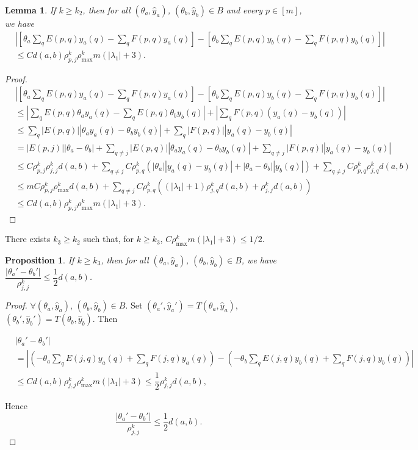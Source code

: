 \documentclass[11pt,a4paper]{article}
\theoremstyle{plain}              %
\newtheorem{lemma}[theorem]{Lemma}
\newtheorem{proposition}[theorem]{Proposition}
\theoremstyle{definition}         %
\begin{document}
\begin{lemma}
If \(k\geq k_2\), then for all \((\theta_a,\hat{y}_a)\), \((\theta_b,\hat{y}_b)\in B\) and every \(p\in[m]\), we have
\begin{align*}
&\left|\left[\theta_a\sum_{q}E(p,q)y_a(q)-\sum_{q}F(p,q)y_a(q)\right]-\left[\theta_b\sum_{q}E(p,q)y_b(q)-\sum_{q}F(p,q)y_b(q)\right]\right|\\
&\leq Cd(a,b)\rho_{p,j}^k\rho_{\max}^km(|\lambda_1|+3).
\end{align*}
\end{lemma}
\begin{proof}
\begin{align*}
&\left|\left[\theta_a\sum_{q}E(p,q)y_a(q)-\sum_{q}F(p,q)y_a(q)\right]-\left[\theta_b\sum_{q}E(p,q)y_b(q)-\sum_{q}F(p,q)y_b(q)\right]\right|\\
&\leq\left|\sum_{q}E(p,q)\theta_ay_a(q)-\sum_{q}E(p,q)\theta_by_b(q)\right|+\left|\sum_{q}F(p,q)(y_a(q)-y_b(q))\right|\\
&\leq\sum_{q}|E(p,q)||\theta_ay_a(q)-\theta_by_b(q)|+\sum_{q}|F(p,q)||y_a(q)-y_b(q)|\\
&=|E(p,j)||\theta_a-\theta_b|+\sum_{q\neq j}|E(p,q)||\theta_ay_a(q)-\theta_by_b(q)|+\sum_{q\neq j}|F(p,q)||y_a(q)-y_b(q)|\\
&\leq C\rho_{p,j}^k\rho_{j,j}^kd(a,b)+\sum_{q\neq j}C\rho_{p,q}^k(|\theta_a||y_a(q)-y_b(q)|+|\theta_a-\theta_b||y_b(q)|)+\sum_{q\neq j}C\rho_{p,q}^k\rho_{j,q}^kd(a,b)\\
&\leq mC\rho_{p,j}^k\rho_{\max}^kd(a,b)+\sum_{q\neq j}C\rho_{p,q}^k((|\lambda_1|+1)\rho_{j,q}^kd(a,b)+\rho_{j,j}^kd(a,b))\\
&\leq Cd(a,b)\rho_{p,j}^k\rho_{\max}^km(|\lambda_1|+3).
\end{align*}
\end{proof}

There exists \(k_3\geq k_2\) such that, for \(k\geq k_3\), \(C\rho_{\max}^km(|\lambda_1|+3)\leq1/2\).

\begin{proposition}
If \(k\geq k_3\), then for all \((\theta_a,\hat{y}_a)\), \((\theta_b,\hat{y}_b)\in B\), we have \(\dfrac{|\theta_a'-\theta_b'|}{\rho_{j,j}^k}\leq\dfrac{1}{2}d(a,b)\).
\end{proposition}
\begin{proof}
\(\forall(\theta_a,\hat{y}_a)\), \((\theta_b,\hat{y}_b)\in B\). Set \((\theta_a',\hat{y}_a')=T(\theta_a,\hat{y}_a)\), \((\theta_b',\hat{y}_b')=T(\theta_b,\hat{y}_b)\). Then

\begin{align*}
&|\theta_a'-\theta_b'|\\
&=\left|\left(-\theta_a\sum_{q}E(j,q)y_a(q)+\sum_{q}F(j,q)y_a(q)\right)-\left(-\theta_b\sum_{q}E(j,q)y_b(q)+\sum_{q}F(j,q)y_b(q)\right)\right|\\
&\leq Cd(a,b)\rho_{j,j}^k\rho_{\max}^km(|\lambda_1|+3)\leq\dfrac{1}{2}\rho_{j,j}^kd(a,b),
\end{align*}

Hence
\[
\dfrac{|\theta_a'-\theta_b'|}{\rho_{j,j}^k}\leq\dfrac{1}{2}d(a,b).
\]
\end{proof}
\end{document}
